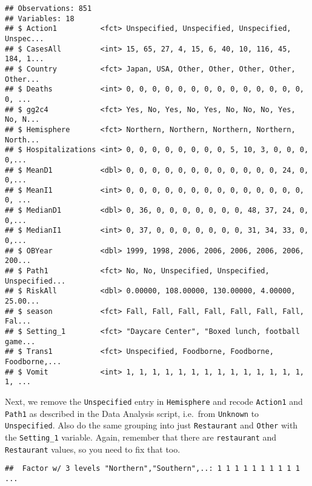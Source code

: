 \documentclass[]{article}
\newenvironment{Shaded}{\begin{snugshade}}{\end{snugshade}}
\newcommand{\CommentTok}[1]{\textcolor[rgb]{0.56,0.35,0.01}{\textit{#1}}}
\newcommand{\KeywordTok}[1]{\textcolor[rgb]{0.13,0.29,0.53}{\textbf{#1}}}
\newcommand{\NormalTok}[1]{#1}
\newcommand{\OperatorTok}[1]{\textcolor[rgb]{0.81,0.36,0.00}{\textbf{#1}}}
\begin{document}
\begin{verbatim}
## Observations: 851
## Variables: 18
## $ Action1          <fct> Unspecified, Unspecified, Unspecified, Unspec...
## $ CasesAll         <int> 15, 65, 27, 4, 15, 6, 40, 10, 116, 45, 184, 1...
## $ Country          <fct> Japan, USA, Other, Other, Other, Other, Other...
## $ Deaths           <int> 0, 0, 0, 0, 0, 0, 0, 0, 0, 0, 0, 0, 0, 0, 0, ...
## $ gg2c4            <fct> Yes, No, Yes, No, Yes, No, No, No, Yes, No, N...
## $ Hemisphere       <fct> Northern, Northern, Northern, Northern, North...
## $ Hospitalizations <int> 0, 0, 0, 0, 0, 0, 0, 0, 5, 10, 3, 0, 0, 0, 0,...
## $ MeanD1           <dbl> 0, 0, 0, 0, 0, 0, 0, 0, 0, 0, 0, 0, 24, 0, 0,...
## $ MeanI1           <int> 0, 0, 0, 0, 0, 0, 0, 0, 0, 0, 0, 0, 0, 0, 0, ...
## $ MedianD1         <dbl> 0, 36, 0, 0, 0, 0, 0, 0, 0, 48, 37, 24, 0, 0,...
## $ MedianI1         <int> 0, 37, 0, 0, 0, 0, 0, 0, 0, 31, 34, 33, 0, 0,...
## $ OBYear           <dbl> 1999, 1998, 2006, 2006, 2006, 2006, 2006, 200...
## $ Path1            <fct> No, No, Unspecified, Unspecified, Unspecified...
## $ RiskAll          <dbl> 0.00000, 108.00000, 130.00000, 4.00000, 25.00...
## $ season           <fct> Fall, Fall, Fall, Fall, Fall, Fall, Fall, Fal...
## $ Setting_1        <fct> "Daycare Center", "Boxed lunch, football game...
## $ Trans1           <fct> Unspecified, Foodborne, Foodborne, Foodborne,...
## $ Vomit            <int> 1, 1, 1, 1, 1, 1, 1, 1, 1, 1, 1, 1, 1, 1, 1, ...
\end{verbatim}

Next, we remove the \texttt{Unspecified} entry in \texttt{Hemisphere}
and recode \texttt{Action1} and \texttt{Path1} as described in the Data
Analysis script, i.e.~from \texttt{Unknown} to \texttt{Unspecified}.
Also do the same grouping into just \texttt{Restaurant} and
\texttt{Other} with the \texttt{Setting\_1} variable. Again, remember
that there are \texttt{restaurant} and \texttt{Restaurant} values, so
you need to fix that too.

\begin{Shaded}
\end{Shaded}

\begin{verbatim}
##  Factor w/ 3 levels "Northern","Southern",..: 1 1 1 1 1 1 1 1 1 1 ...
\end{verbatim}
\end{document}
